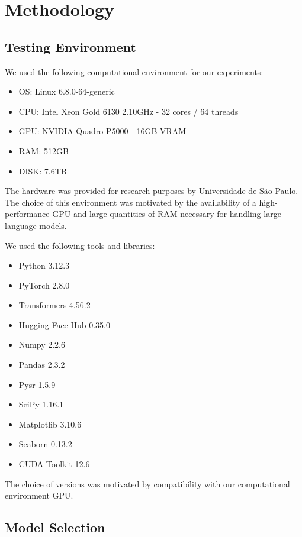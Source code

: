 \section{Methodology}

\subsection{Testing Environment}

We used the following computational environment for our experiments:
\begin{itemize}
    \item OS: Linux 6.8.0-64-generic
    \item CPU: Intel Xeon Gold 6130 2.10GHz - 32 cores / 64 threads
    \item GPU: NVIDIA Quadro P5000 - 16GB VRAM
    \item RAM: 512GB
    \item DISK: 7.6TB 
\end{itemize}
The hardware was provided for research purposes by Universidade de São Paulo. The choice of this environment was motivated by the availability of a high-performance GPU and large quantities of RAM necessary for handling large language models.

We used the following tools and libraries:
\begin{itemize}
    \item Python 3.12.3
    \item PyTorch 2.8.0 \cite{Paszke2019}
    \item Transformers 4.56.2 \cite{Wolf2019}
    \item Hugging Face Hub 0.35.0 \cite{HuggingFaceHub}
    \item Numpy 2.2.6
    \item Pandas 2.3.2
    \item Pysr 1.5.9
    \item SciPy 1.16.1
    \item Matplotlib 3.10.6
    \item Seaborn 0.13.2 \cite{Waskom2021}
    \item CUDA Toolkit 12.6
\end{itemize}
The choice of versions was motivated by compatibility with our computational environment GPU.

\subsection{Model Selection}

